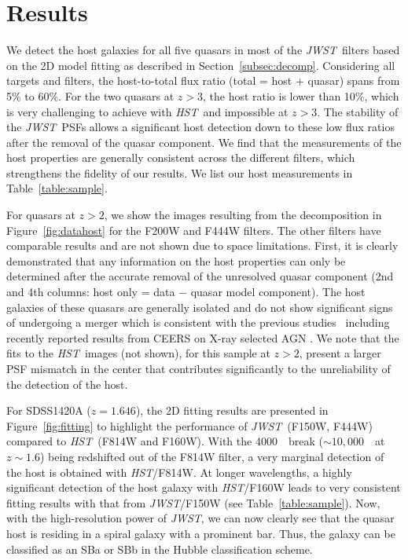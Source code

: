 \documentclass[twocolumn]{aastex631}
\newcommand{\hst}{{\it HST}}
\newcommand{\jwst}{{\it JWST}}
\newcommand{\angstrom}{\text{\normalfont\AA}}
\begin{document}
\section{Results} \label{sec:result}
We detect the host galaxies for all five quasars in most of the \jwst\ filters based on the 2D model fitting as described in Section~\ref{subsec:decomp}. Considering all targets and filters, the host-to-total flux ratio (total = host + quasar) spans from 5\% to 60\%. For the two quasars at $z>3$, the host ratio is lower than 10\%, which is very challenging to achieve with \hst\ and impossible at $z>3$. The stability of the \jwst\ PSFs allows a significant host detection down to these low flux ratios after the removal of the quasar component. We find that the measurements of the host properties are generally consistent across the different filters, which strengthens the fidelity of our results. We list our host measurements in Table~\ref{table:sample}.

For quasars at $z>2$, we show the images resulting from the decomposition in Figure~\ref{fig:datahost} for the F200W and F444W filters. The other filters have comparable results and are not shown due to space limitations. First, it is clearly demonstrated that any information on the host properties can only be determined after the accurate removal of the unresolved quasar component (2nd and 4th columns: host only = data $-$ quasar model component). The host galaxies of these quasars are generally isolated and do not show significant signs of undergoing a merger which is consistent with the previous studies~\citep[e.g.,][]{Cisternas2011,Kocevski2012,Ding2020} including recently reported results from CEERS on X-ray selected AGN \citep{Kocevski2022}.  We note that the fits to the \hst\ images (not shown), for this sample at $z>2$, present a larger PSF mismatch in the center that contributes significantly to the unreliability of the detection of the host. 


For SDSS1420A ($z=1.646$), the 2D fitting results are presented in Figure~\ref{fig:fitting} to highlight the performance of \jwst\ (F150W, F444W) compared to \hst\ (F814W and F160W). With the 4000~\angstrom\ break ($\sim 10,000$~\angstrom\ at $z\sim1.6$) being redshifted out of the F814W filter, a very marginal detection of the host is obtained with \hst/F814W. At longer wavelengths, a highly significant detection of the host galaxy with \hst/F160W leads to very consistent fitting results with that from \jwst/F150W (see Table~\ref{table:sample}). Now, with the high-resolution power of \jwst, we can now clearly see that the quasar host is residing in a spiral galaxy with a prominent bar. Thus, the galaxy can be classified as an SBa or SBb in the Hubble classification scheme. 
\end{document}
